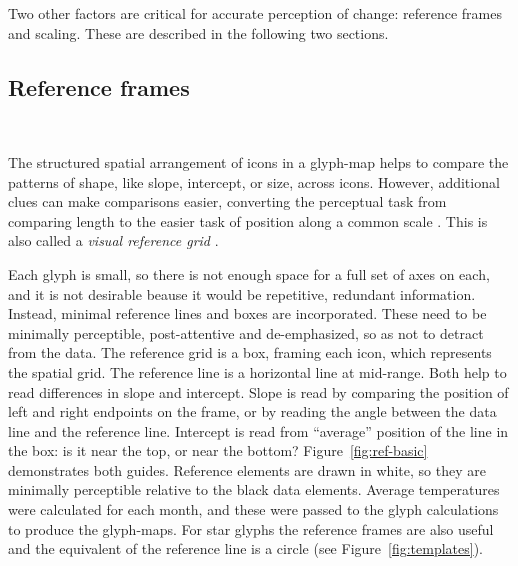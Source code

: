 \documentclass[oneside]{article}
\begin{document}
Two other factors are critical for accurate perception of change: reference frames and scaling. These are described in the following two sections.

\subsection{Reference frames}~\label{sec:reference}

The structured spatial arrangement of icons in a glyph-map helps to compare the patterns of shape, like slope, intercept, or size, across icons. However, additional clues can make comparisons easier, converting the perceptual task from comparing length to the easier task of position along a common scale \citep{cleveland:1984}. This is also called a \emph{visual reference grid} \citep{cleveland:1993a}.

Each glyph is small, so there is not enough space for a full set of axes on each, and it is not desirable beause it would be repetitive, redundant information. Instead, minimal reference lines and boxes are incorporated. These need to be minimally perceptible, post-attentive \citep{healey} and de-emphasized, so as not to detract from the data. The reference grid is a box, framing each icon, which represents the spatial grid. The reference line is a horizontal line at mid-range. Both help to read differences in slope and intercept. Slope is read by comparing the position of left and right endpoints on the frame, or by reading the angle between the data line and the reference line. Intercept is read from ``average'' position of the line in the box: is it near the top, or near the bottom? Figure~\ref{fig:ref-basic} demonstrates both guides. Reference elements are drawn in white, so they are minimally perceptible relative to the black data elements. Average temperatures were calculated for each month, and these were passed to the glyph calculations to produce the glyph-maps.   For star glyphs the reference frames are also useful and the equivalent of the reference line is a circle (see Figure~\ref{fig:templates}).

\end{document}
